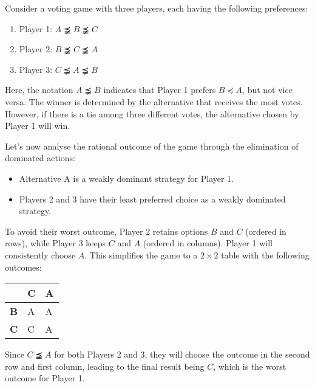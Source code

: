 \begin{example}
    Consider a voting game with three players, each having the following preferences:
    \begin{enumerate}
        \item Player 1: $A \precneqq B \precneqq C$
        \item Player 2: $B \precneqq C \precneqq A$
        \item Player 3: $C \precneqq A \precneqq B$
    \end{enumerate}
    Here, the notation $A \precneqq B$ indicates that Player 1 prefers $B \preceq A$, but not vice versa. 
    The winner is determined by the alternative that receives the most votes. 
    However, if there is a tie among three different votes, the alternative chosen by Player 1 will win.

    Let's now analyse the rational outcome of the game through the elimination of dominated actions:
    \begin{itemize}
        \item Alternative A is a weakly dominant strategy for Player 1.
        \item Players 2 and 3 have their least preferred choice as a weakly dominated strategy.
    \end{itemize}
    To avoid their worst outcome, Player 2 retains options $B$ and $C$ (ordered in rows), while Player 3 keeps $C$ and $A$ (ordered in columns). 
    Player 1 will consistently choose $A$. 
    This simplifies the game to a $2 \times 2$ table with the following outcomes:
    \begin{table}[H]
        \centering
        \begin{tabular}{l|ll|}
        \cline{2-3}
        \textbf{}                        & \textbf{C} & \textbf{A} \\ \hline
        \multicolumn{1}{|l|}{\textbf{B}} & A          & A          \\
        \multicolumn{1}{|l|}{\textbf{C}} & C          & A          \\ \hline
        \end{tabular}
    \end{table}
    Since $C \precneqq A$ for both Players 2 and 3, they will choose the outcome in the second row and first column, leading to the final result being $C$, which is the worst outcome for Player 1.
\end{example}
